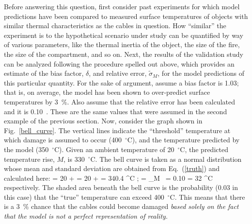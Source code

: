 Before answering this question, first consider past experiments for which model predictions have been compared to measured surface temperatures of objects
with similar thermal characteristics as the cables in question. How ``similar'' the experiment is to the hypothetical scenario under study can be quantified by way of
various parameters, like the thermal inertia of the object, the size of the fire, the size of the compartment, and so on. Next, the results of the validation study can be
analyzed following the procedure spelled out above, which provides an estimate of the bias factor, $\delta$, and relative error, $\tilde{\sigma}_M$, for the model
predictions of this particular quantity. For the sake of argument, assume a bias factor is 1.03; that is, on average, the model has been shown to over-predict
surface temperatures by 3~\%. Also assume that the relative error has been calculated and it is 0.10~. These are the same values that were assumed in the second example
of the previous section.
Now, consider the graph shown in Fig.~\ref{bell_curve}.
The vertical lines indicate the ``threshold'' temperature at which damage is assumed to occur (400~$^\circ$C), and the temperature predicted by the
model (350~$^\circ$C). Given an ambient temperature of 20~$^\circ$C, the predicted temperature rise, $M$, is 330~$^\circ$C.
The bell curve is taken as a normal distribution whose mean and standard deviation are obtained from Eq.~(\ref{truth}) and calculated here:
\be \mu = 20 +  = 20 +  = 340.4 \; ^\circ \hbox{C}  \quad ; \quad
   \sigma = \widetilde{\sigma}_M \,  = 0.10 \times {} = 32 \; ^\circ \hbox{C}  \ee
respectively. The shaded area beneath the bell curve is the probability (0.03 in this case) that the ``true'' temperature can exceed 400~$^\circ$C.
This means that there is a 3~\% chance that the cables could
become damaged {\em based solely on the fact that the model is not a perfect representation of reality.}


